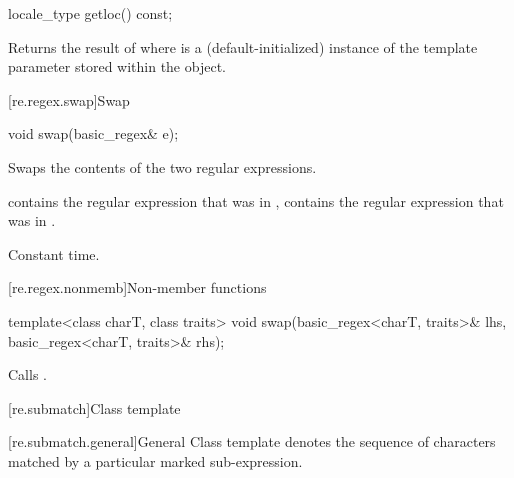 %
\begin{itemdecl}
locale_type getloc() const;
\end{itemdecl}

\begin{itemdescr}
\pnum
\effects
Returns the result of  where
 is a (default-initialized) instance of the template
parameter  stored within the object.
\end{itemdescr}

[re.regex.swap]{Swap}
%

%
\begin{itemdecl}
void swap(basic_regex& e);
\end{itemdecl}

\begin{itemdescr}
\pnum
\effects
Swaps the contents of the two regular expressions.

\pnum
\ensures
{} contains the regular expression
that was in ,  contains the regular expression that
was in .

\pnum
\complexity
Constant time.
\end{itemdescr}

[re.regex.nonmemb]{Non-member functions}

%
\begin{itemdecl}
template<class charT, class traits>
  void swap(basic_regex<charT, traits>& lhs, basic_regex<charT, traits>& rhs);
\end{itemdecl}

\begin{itemdescr}
\pnum
\effects
Calls .
\end{itemdescr}

[re.submatch]{Class template }

[re.submatch.general]{General}
\pnum
{}%
Class template  denotes the sequence of characters matched
by a particular marked sub-expression.

